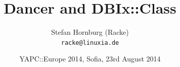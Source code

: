 \usepackage[utf8]{inputenc}
\usepackage[T1]{fontenc}
\usepackage{mathptmx}
\usepackage[scaled=.90]{helvet}
\usepackage{courier}
\usepackage{caption}
\captionsetup{labelformat=empty,labelsep=none}
\usepackage{verbatim}
\usepackage{hyperref}
\usepackage{listings}
\usepackage{ulem}
\lstset{language=Perl,basicstyle=\normalsize,tabsize=3,showstringspaces=false}

\title{Dancer and DBIx::Class}
\author[racke]{Stefan Hornburg (Racke)\\ \texttt{racke@linuxia.de}}
\date{YAPC::Europe 2014, Sofia, 23rd August 2014}


\maketitle{}

\begin{frame}
  \titlepage
\end{frame}

\tableofcontents








